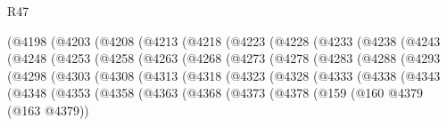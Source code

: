 \begin{lexlean}{R47}
\begin{coremodule}
                (@4198
                  (@4203
                    (@4208
                      (@4213
                        (@4218
                          (@4223
                            (@4228
                              (@4233
                                (@4238
                                  (@4243
                                    (@4248
                                      (@4253
                                        (@4258
                                          (@4263
                                            (@4268
                                              (@4273
                                                (@4278
                                                  (@4283
                                                    (@4288
                                                      (@4293
                                                        (@4298
                                                          (@4303
                                                            (@4308
                                                              (@4313
                                                                (@4318
                                                                  (@4323
                                                                    (@4328
                                                                      (@4333
                                                                        (@4338
                                                                          (@4343
                                                                            (@4348
                                                                              (@4353
                                                                                (@4358
                                                                                  (@4363
                                                                                    (@4368
                                                                                      (@4373
                                                                                        (@4378
                                                                                          (@159
                                                                                            (@160
                                                                                              @4379
                                                                                              (@163
                                                                                                @4379))

\end{coremodule}
\end{lexlean}
